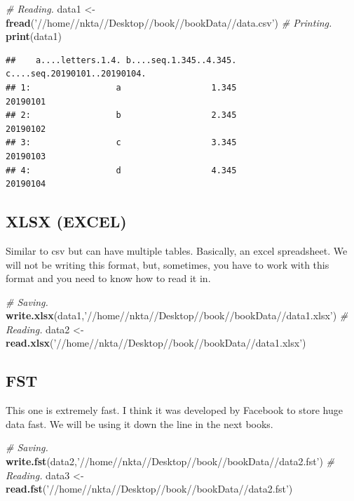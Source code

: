 \documentclass[]{book}
\newenvironment{Shaded}{\begin{snugshade}}{\end{snugshade}}
\newcommand{\CommentTok}[1]{\textcolor[rgb]{0.56,0.35,0.01}{\textit{#1}}}
\newcommand{\KeywordTok}[1]{\textcolor[rgb]{0.13,0.29,0.53}{\textbf{#1}}}
\newcommand{\NormalTok}[1]{#1}
\newcommand{\StringTok}[1]{\textcolor[rgb]{0.31,0.60,0.02}{#1}}
\begin{document}
\begin{Shaded}
\begin{Highlighting}[]
\CommentTok{# Reading.}
\NormalTok{data1 <-}\StringTok{ }\KeywordTok{fread}\NormalTok{(}\StringTok{'//home//nkta//Desktop//book//bookData//data.csv'}\NormalTok{)}
\CommentTok{# Printing.}
\KeywordTok{print}\NormalTok{(data1)}
\end{Highlighting}
\end{Shaded}

\begin{verbatim}
##    a....letters.1.4. b....seq.1.345..4.345. c....seq.20190101..20190104.
## 1:                 a                  1.345                     20190101
## 2:                 b                  2.345                     20190102
## 3:                 c                  3.345                     20190103
## 4:                 d                  4.345                     20190104
\end{verbatim}

\hypertarget{xlsx-excel}{%
\subsection{XLSX (EXCEL)}\label{xlsx-excel}}

Similar to csv but can have multiple tables. Basically, an excel spreadsheet. We will not be writing this format, but, sometimes, you have to work with this format and you need to know how to read it in.

\begin{Shaded}
\begin{Highlighting}[]
\CommentTok{# Saving.}
\KeywordTok{write.xlsx}\NormalTok{(data1,}\StringTok{'//home//nkta//Desktop//book//bookData//data1.xlsx'}\NormalTok{)}
\CommentTok{# Reading.}
\NormalTok{data2 <-}\StringTok{ }\KeywordTok{read.xlsx}\NormalTok{(}\StringTok{'//home//nkta//Desktop//book//bookData//data1.xlsx'}\NormalTok{)}
\end{Highlighting}
\end{Shaded}

\hypertarget{fst}{%
\subsection{FST}\label{fst}}

This one is extremely fast. I think it was developed by Facebook to store huge data fast. We will be using it down the line in the next books.

\begin{Shaded}
\begin{Highlighting}[]
\CommentTok{# Saving.}
\KeywordTok{write.fst}\NormalTok{(data2,}\StringTok{'//home//nkta//Desktop//book//bookData//data2.fst'}\NormalTok{)}
\CommentTok{# Reading.}
\NormalTok{data3 <-}\StringTok{ }\KeywordTok{read.fst}\NormalTok{(}\StringTok{'//home//nkta//Desktop//book//bookData//data2.fst'}\NormalTok{)}
\end{Highlighting}
\end{Shaded}
\end{document}
